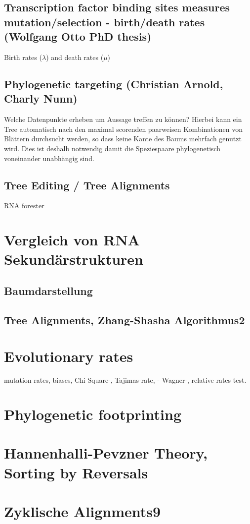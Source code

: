 \documentclass[%
   final,      %
   paper=a4,%
   paper=portrait, %
   pagesize=auto, %
   fontsize=11pt,%
 ]{scrreprt} %
\begin{document}
\subsection{Transcription factor binding sites measures mutation/selection - birth/death rates (Wolfgang Otto PhD thesis)}
Birth rates ($\lambda$) and death rates ($\mu$) 
\subsection{Phylogenetic targeting (Christian Arnold, Charly Nunn)}
Welche Datenpunkte erheben um Aussage treffen zu können? Hierbei kann ein Tree automatisch nach den maximal scorenden paarweisen Kombinationen von Blättern durchsucht werden, so dass keine Kante des Baums mehrfach genutzt wird. Dies ist deshalb notwendig damit die Speziespaare  phylogenetisch voneinander unabhängig sind.
\subsection{Tree Editing / Tree Alignments}
RNA forester
\section{Vergleich von RNA Sekundärstrukturen}
\subsection{Baumdarstellung}
\subsection{Tree Alignments, Zhang-Shasha Algorithmus2}

\section{Evolutionary rates}
mutation rates, 	biases, Chi Square-, Tajimas-rate, - Wagner-, relative rates test.

\section{Phylogenetic footprinting}

\section{Hannenhalli-Pevzner Theory, Sorting by Reversals}
\section{Zyklische Alignments9}
\end{document}
